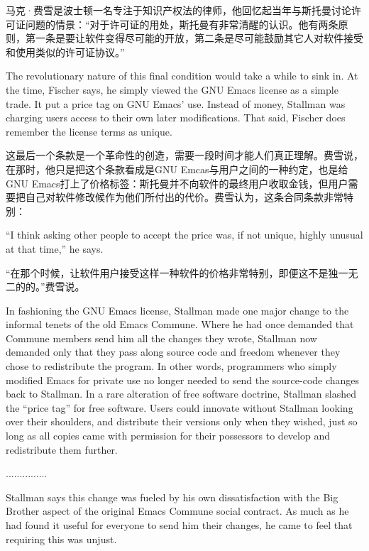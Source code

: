 \ifdefined\chs
马克·费雪是波士顿一名专注于知识产权法的律师，他回忆起当年与斯托曼讨论许可证问题的情景：“对于许可证的用处，斯托曼有非常清醒的认识。他有两条原则，第一条是要让软件变得尽可能的开放，第二条是尽可能鼓励其它人对软件接受和使用类似的许可证协议。”
\fi

\ifdefined\eng
The revolutionary nature of this final condition would take a while to sink in. At the time, Fischer says, he simply viewed the GNU Emacs license as a simple trade. It put a price tag on GNU Emacs' use. Instead of money, Stallman was charging users access to their own later modifications. That said, Fischer does remember the license terms as unique.
\fi

\ifdefined\chs
这最后一个条款是一个革命性的创造，需要一段时间才能人们真正理解。费雪说，在那时，他只是把这个条款看成是GNU Emcas与用户之间的一种约定，也是给GNU Emacs打上了价格标签：斯托曼并不向软件的最终用户收取金钱，但用户需要把自己对软件修改候作为他们所付出的代价。费雪认为，这条合同条款非常特别：
\fi

\ifdefined\eng
``I think asking other people to accept the price was, if not unique, highly unusual at that time,'' he says.
\fi

\ifdefined\chs
“在那个时候，让软件用户接受这样一种软件的价格非常特别，即便这不是独一无二的的。”费雪说。
\fi

\ifdefined\eng
In fashioning the GNU Emacs license, Stallman made one major change to the informal tenets of the old Emacs Commune. Where he had once demanded that Commune members send him all the changes they wrote, Stallman now demanded only that they pass along source code and freedom whenever they chose to redistribute the program. In other words, programmers who simply modified Emacs for private use no longer needed to send the source-code changes back to Stallman. In a rare alteration of free software doctrine, Stallman slashed the ``price tag'' for free software. Users could innovate without Stallman looking over their shoulders, and distribute their versions only when they wished, just so long as all copies came with permission for their possessors to develop and redistribute them further.
\fi

\ifdefined\chs
...............
\fi

\ifdefined\eng
Stallman says this change was fueled by his own dissatisfaction with the Big Brother aspect of the original Emacs Commune social contract. As much as he had found it useful for everyone to send him their changes, he came to feel that requiring this was unjust.
\fi

